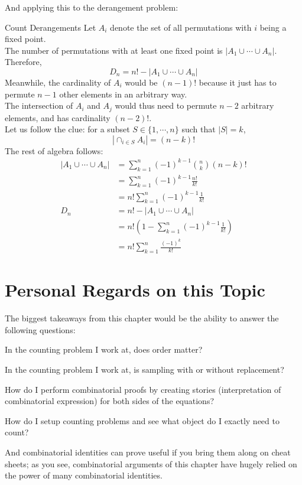 And applying this to the derangement problem:
\begin{ln-quest}{Count Derangements}{}
    Let $A_i$ denote the set of all permutations with $i$ being a fixed point. \\
    The number of permutations with at least one fixed point is $|A_1 \cup \cdots \cup A_n|$. Therefore,
    \[D_n = n! - |A_1 \cup \cdots \cup A_n|\]
    Meanwhile, the cardinality of $A_i$ would be $(n - 1)!$ because it just has to permute $n - 1$ other elements in an arbitrary way. \\
    The intersection of $A_i$ and $A_j$ would thus need to permute $n - 2$ arbitrary elements, and has cardinality $(n - 2)!$. \\
    Let us follow the clue: for a subset $S \in \{1, \cdots, n\}$ such that $|S| = k$,
    \[|\cap_{i \in S} A_i| = (n - k)!\]
    The rest of algebra follows:
    \begin{align*}
        |A_1 \cup \cdots \cup A_n|
        &= \sum_{k = 1}^n {(-1)}^{k - 1} \binom{n}{k} (n - k)! \\
        &= \sum_{k = 1}^n {(-1)}^{k - 1} \frac{n!}{k!} \\
        &= n! \sum_{k = 1}^n {(-1)}^{k - 1} \frac{1}{k!} \\
        D_n
        &= n! - |A_1 \cup \cdots \cup A_n| \\
        &= n! (1 - \sum_{k = 1}^n {(-1)}^{k - 1} \frac{1}{k!}) \\
        &= n! \sum_{k = 1}^n \frac{{(-1)}^{k}}{k!}
    \end{align*}
\end{ln-quest}

\section{Personal Regards on this Topic}
The biggest takeaways from this chapter would be the ability to answer the following questions:
\begin{bindenum}
    \item In the counting problem I work at, does order matter?
    \item In the counting problem I work at, is sampling with or without replacement?
    \item How do I perform combinatorial proofs by creating stories (interpretation of combinatorial expression) for both sides of the equations?
    \item How do I setup counting problems and see what object do I exactly need to count?
\end{bindenum}
And combinatorial identities can prove useful if you bring them along on cheat sheets; as you see, combinatorial arguments of this chapter have hugely relied on the power of many combinatorial identities.
